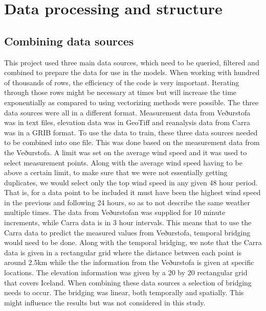 \chapter{Data processing and structure} %

\label{Chapter3} %


\section{Combining data sources}

This project used three main data sources, which need to be queried, filtered and combined to prepare the data for use in the models. When working with hundred of thousands of rows, the efficiency of the code is very important. Iterating through those rows might be necessary at times but will increase the time exponentially as compared to using vectorizing methods were possible. The three data sources were all in a different format. Measurement data from Veðurstofa was in text files, elevation data was in GeoTiff and reanalysis data from Carra was in a GRIB format. To use the data to train, these three data sources needed to be combined into one file. This was done based on the measurement data from the Veðurstofa. A limit was set on the average wind speed and it was used to select measurement points. Along with the average wind speed having to be above a certain limit, to make sure that we were not essentially getting duplicates, we would select only the top wind speed in any given 48 hour period. That is, for a data point to be included it must have been the highest wind speed in the previous and following 24 hours, so as to not describe the same weather multiple times. The data from Veðurstofan was supplied for 10 minute increments, while Carra data is in 3 hour intervals. This means that to use the Carra data to predict the measured values from Veðurstofa, temporal bridging would need to be done. Along with the temporal bridging, we note that the Carra data is given in a rectangular grid where the distance between each point is around 2.5km while the the information from the Veðurstofa is given at specific locations. The elevation information was given by a 20 by 20 rectangular grid that covers Iceland. When combining these data sources a selection of bridging needs to occur. The bridging was linear, both temporally and spatially. This might influence the results but was not considered in this study.

